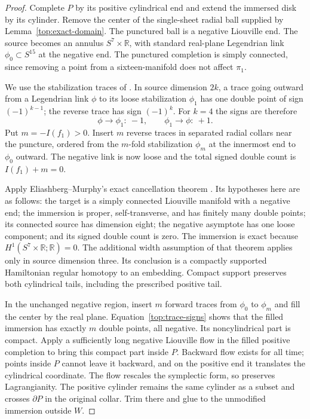 \documentclass[11pt]{article}
\theoremstyle{definition}
\theoremstyle{remark}
\numberwithin{equation}{section}
\begin{document}
\begin{proof}
Complete $P$ by its positive cylindrical end and extend the
immersed disk by its cylinder.  Remove the center of the
single-sheet radial ball supplied by Lemma~\ref{top:exact-domain}.
The punctured ball is a negative Liouville end.  The source
becomes an annulus $S^7\times\mathbb R$, with standard real-plane
Legendrian link $\phi_0\subset S^{15}$ at the negative end.
The punctured completion is simply connected, since removing
a point from a sixteen-manifold does not affect $\pi_1$.

We use the stabilization traces of
\cite[Lemma~3.2 and proof of Lemma~3.4]{eems}.  In source
dimension $2k$, a trace going outward from a Legendrian link
$\phi$ to its loose stabilization $\phi_1$ has one double
point of sign $(-1)^{k-1}$; the reverse trace has sign
$(-1)^k$.  For $k=4$ the signs are therefore
\begin{equation}\label{top:trace-signs}
 \phi\longrightarrow\phi_1:\ -1,
 \qquad \phi_1\longrightarrow\phi:\ +1.
\end{equation}
Put $m=-I(f_1)>0$.  Insert $m$ reverse traces in separated
radial collars near the puncture, ordered from the $m$-fold
stabilization $\phi_m$ at the innermost end to $\phi_0$
outward.  The negative link is now loose and the total signed
double count is $I(f_1)+m=0$.

Apply Eliashberg--Murphy's exact cancellation theorem
\cite[Theorem~2.3]{em-caps}.  Its hypotheses here are as
follows: the target is a simply connected Liouville manifold
with a negative end; the immersion is proper, self-transverse,
and has finitely many double points; its connected source has
dimension eight; the negative asymptote has one loose
component; and its signed double count is zero.  The
immersion is exact because $H^1(S^7\times\mathbb R;\mathbb R)=0$.
The additional width assumption of that theorem applies
only in source dimension three.  Its conclusion is a
compactly supported Hamiltonian regular homotopy to an
embedding.  Compact support preserves both cylindrical
tails, including the prescribed positive tail.

In the unchanged negative region, insert $m$ forward traces
from $\phi_0$ to $\phi_m$ and fill the center by the real
plane.  Equation~\eqref{top:trace-signs} shows that the filled
immersion has exactly $m$ double points, all negative.  Its
noncylindrical part is compact.  Apply a sufficiently long
negative Liouville flow in the filled positive completion to
bring this compact part inside $P$.  Backward flow exists
for all time; points inside $P$ cannot leave it backward,
and on the positive end it translates the cylindrical
coordinate.  The flow rescales the symplectic form, so
preserves Lagrangianity.  The positive cylinder remains the
same cylinder as a subset and crosses $\partial P$ in the
original collar.  Trim there and glue to the unmodified
immersion outside $W$.


\end{proof}
\end{document}
